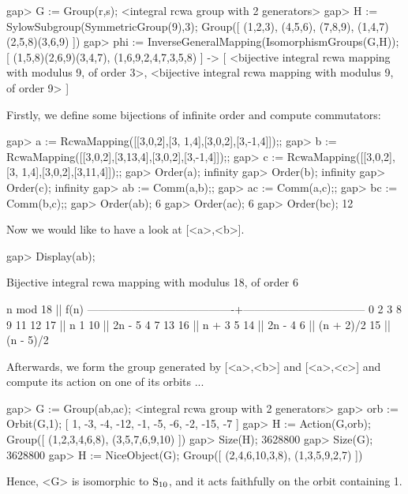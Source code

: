 gap> G := Group(r,s);
<integral rcwa group with 2 generators>
gap> H := SylowSubgroup(SymmetricGroup(9),3);
Group([ (1,2,3), (4,5,6), (7,8,9), (1,4,7)(2,5,8)(3,6,9) ])
gap> phi := InverseGeneralMapping(IsomorphismGroups(G,H));
[ (1,5,8)(2,6,9)(3,4,7), (1,6,9,2,4,7,3,5,8) ] ->
[ <bijective integral rcwa mapping with modulus 9, of order 3>,
  <bijective integral rcwa mapping with modulus 9, of order 9> ]
\endexample


Firstly, we define some bijections of infinite order and compute
commutators:

\beginexample
gap> a := RcwaMapping([[3,0,2],[3, 1,4],[3,0,2],[3,-1,4]]);;
gap> b := RcwaMapping([[3,0,2],[3,13,4],[3,0,2],[3,-1,4]]);;
gap> c := RcwaMapping([[3,0,2],[3, 1,4],[3,0,2],[3,11,4]]);;
gap> Order(a);
infinity
gap> Order(b);
infinity
gap> Order(c);
infinity
gap> ab := Comm(a,b);;
gap> ac := Comm(a,c);;
gap> bc := Comm(b,c);;
gap> Order(ab);
6
gap> Order(ac);
6
gap> Order(bc);
12
\endexample

Now we would like to have a look at [<a>,<b>].

\beginexample 
gap> Display(ab);

Bijective integral rcwa mapping with modulus 18, of order 6

               n mod 18                 ||              f(n)              
----------------------------------------+---------------------------------
   0  2  3  8  9 11 12 17               || n
   1 10                                 || 2n - 5
   4  7 13 16                           || n + 3
   5 14                                 || 2n - 4
   6                                    || (n + 2)/2
  15                                    || (n - 5)/2

\endexample

Afterwards, we form the group generated by [<a>,<b>] and [<a>,<c>] and
compute its action on one of its orbits ...

\beginexample
gap> G := Group(ab,ac);
<integral rcwa group with 2 generators>
gap> orb := Orbit(G,1);
[ 1, -3, -4, -12, -1, -5, -6, -2, -15, -7 ]
gap> H := Action(G,orb);
Group([ (1,2,3,4,6,8), (3,5,7,6,9,10) ])
gap> Size(H);
3628800
gap> Size(G);
3628800
gap> H := NiceObject(G);
Group([ (2,4,6,10,3,8), (1,3,5,9,2,7) ])
\endexample

Hence, <G> is isomorphic to ${\rm S}_{10}$, and it acts faithfully on
the orbit containing 1.

